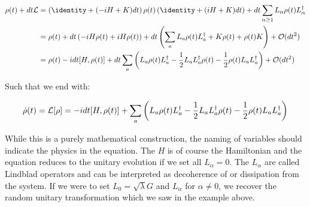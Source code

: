 \begin{fullwidth}
\begin{align}
    \rho(t) + dt \lindbladian &= \left(\identity + (-iH + K)dt\right)\rho(t)\left(\identity + (iH + K)dt\right) + dt \sum_{\alpha \geq 1} L_\alpha \rho(t) L_\alpha^\dagger \\
    &= \rho(t) + dt \left(-i H \rho(t) + iH \rho(t)\right) + dt \left(\sum_a L_a \rho(t) L_a^\dagger + K \rho(t) + \rho(t) K\right) + \mathcal{O}(dt^2) \\
    &= \rho(t) -i dt[H, \rho(t)] + dt \sum_a \left(L_a \rho(t) L_a^\dagger - \frac12 L_a L_a^\dagger \rho(t) - \frac12 \rho(t)L_a L_a^\dagger  \right) + \mathcal{O}(dt^2)
\end{align}
\end{fullwidth}

Such that we end with:
\begin{fullwidth}
\begin{equation}
    \dot{\rho}(t) = \mathcal{L}[\rho] = -i dt[H, \rho(t)] +  \sum_a \left(L_a \rho(t) L_a^\dagger - \frac12 L_a L_a^\dagger \rho(t) - \frac12 \rho(t)L_a L_a^\dagger  \right)
\end{equation}
\end{fullwidth}

While this is a purely mathematical construction, the naming of variables should indicate the physics in the equation. The $H$ is of course the Hamiltonian and the equation reduces to the unitary evolution if we set all $L_\alpha = 0$. The ${L_\alpha}$ are called Lindblad operators and can be interpreted as decoherence of or dissipation from the system. If we were to set $L_0 = \sqrt{\lambda} G$ and $L_\alpha$ for $\alpha \neq 0$, we recover the random unitary transformation which we saw in the example above. \cite{preskill_lecture_notes}

